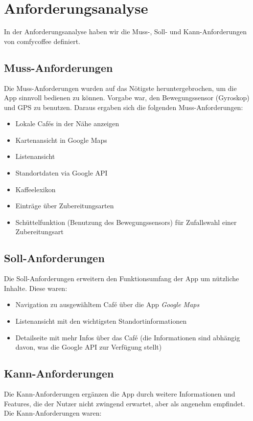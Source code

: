 \section{Anforderungsanalyse}
In der Anforderungsanalyse haben wir die Muss-, Soll- und Kann-Anforderungen von comfycoffee definiert.

\subsection{Muss-Anforderungen}
\label{subsec:mussanforderungen}
Die Muss-Anforderungen wurden auf das Nötigste heruntergebrochen, um die App sinnvoll bedienen zu können. Vorgabe war, den Bewegungssensor (Gyroskop) und GPS zu benutzen. Daraus ergaben sich die folgenden Muss-Anforderungen:

\begin{itemize}
	\item Lokale Cafés in der Nähe anzeigen
	\item Kartenansicht in Google Maps
	\item Listenansicht
	\item Standortdaten via Google API
	\item Kaffeelexikon
	\item Einträge über Zubereitungsarten
	\item Schüttelfunktion (Benutzung des Bewegungssensors) für Zufallswahl einer Zubereitungsart
\end{itemize}

\subsection{Soll-Anforderungen}
Die Soll-Anforderungen erweitern den Funktionsumfang der App um nützliche Inhalte. Diese waren:

\begin{itemize}
	\item Navigation zu ausgewähltem Café über die App \emph{Google Maps}
	\item Listenansicht mit den wichtigsten Standortinformationen
	\item Detailseite mit mehr Infos über das Café (die Informationen sind abhängig davon, was die Google API zur Verfügung stellt)
\end{itemize}

\subsection{Kann-Anforderungen}
Die Kann-Anforderungen ergänzen die App durch weitere Informationen und Features, die der Nutzer nicht zwingend erwartet, aber als angenehm empfindet. Die Kann-Anforderungen waren:

